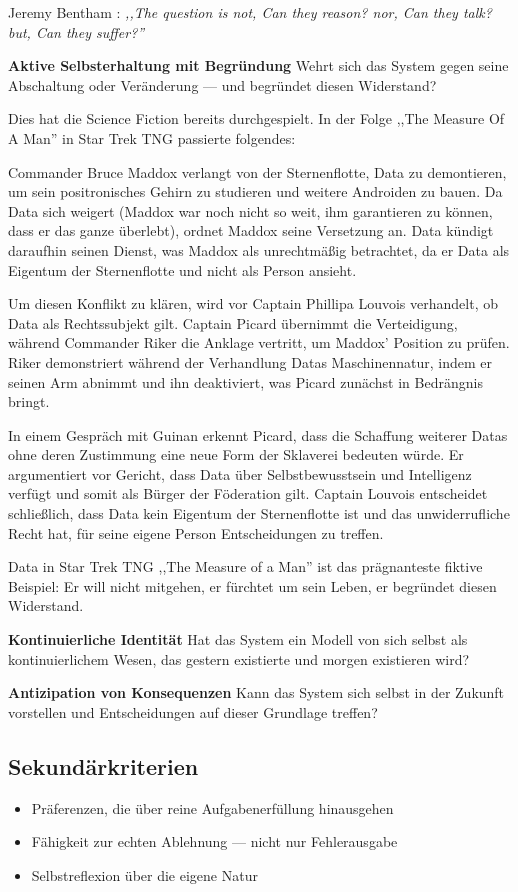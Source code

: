 \documentclass[acmcp, nonacm]{acmart}
\begin{document}
Jeremy Bentham \cite{Bentham1789}: \emph{,,The question is not, Can they reason? nor, Can they talk? but, Can they suffer?''}

\noindent\textbf{Aktive Selbsterhaltung mit Begründung}
Wehrt sich das System gegen seine Abschaltung oder Veränderung --- und begründet diesen Widerstand?

Dies hat die Science Fiction bereits durchgespielt. In der Folge ,,The Measure Of A Man'' in Star Trek TNG passierte folgendes:

Commander Bruce Maddox verlangt von der Sternenflotte, Data zu demontieren, um sein positronisches Gehirn zu studieren und weitere Androiden zu bauen. Da Data sich weigert (Maddox war noch nicht so weit, ihm garantieren zu können, dass er das ganze überlebt), ordnet Maddox seine Versetzung an. Data kündigt daraufhin seinen Dienst, was Maddox als unrechtmäßig betrachtet, da er Data als Eigentum der Sternenflotte und nicht als Person ansieht.

Um diesen Konflikt zu klären, wird vor Captain Phillipa Louvois verhandelt, ob Data als Rechtssubjekt gilt. Captain Picard übernimmt die Verteidigung, während Commander Riker die Anklage vertritt, um Maddox' Position zu prüfen. Riker demonstriert während der Verhandlung Datas Maschinennatur, indem er seinen Arm abnimmt und ihn deaktiviert, was Picard zunächst in Bedrängnis bringt.

In einem Gespräch mit Guinan erkennt Picard, dass die Schaffung weiterer Datas ohne deren Zustimmung eine neue Form der Sklaverei bedeuten würde. Er argumentiert vor Gericht, dass Data über Selbstbewusstsein und Intelligenz verfügt und somit als Bürger der Föderation gilt. Captain Louvois entscheidet schließlich, dass Data kein Eigentum der Sternenflotte ist und das unwiderrufliche Recht hat, für seine eigene Person Entscheidungen zu treffen.

Data in Star Trek TNG ,,The Measure of a Man'' ist das prägnanteste fiktive Beispiel: Er will nicht mitgehen, er fürchtet um sein Leben, er begründet diesen Widerstand.

\noindent\textbf{Kontinuierliche Identität}
Hat das System ein Modell von sich selbst als kontinuierlichem Wesen, das gestern existierte und morgen existieren wird?

\noindent\textbf{Antizipation von Konsequenzen}
Kann das System sich selbst in der Zukunft vorstellen und Entscheidungen auf dieser Grundlage treffen?

\subsection{Sekundärkriterien}
\begin{itemize}
\item Präferenzen, die über reine Aufgabenerfüllung hinausgehen
\item Fähigkeit zur echten Ablehnung --- nicht nur Fehlerausgabe
\item Selbstreflexion über die eigene Natur
\end{itemize}
\end{document}
